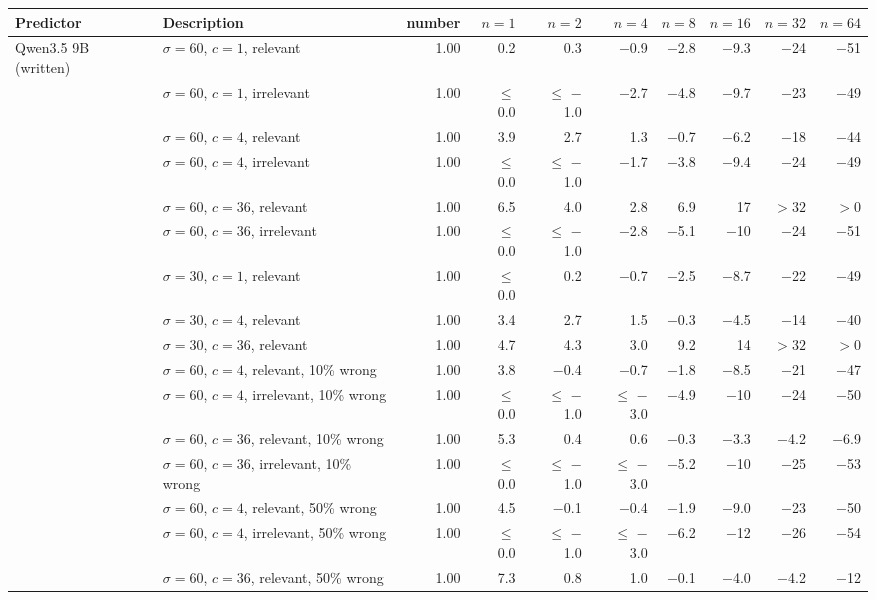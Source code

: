 \begin{tabular}{llrrrrrrrr}
\toprule
Predictor & Description & number & $n = 1$ & $n = 2$ & $n = 4$ & $n = 8$ & $n = 16$ & $n = 32$ & $n = 64$ \\
\midrule
Qwen3.5 9B (written) & $\sigma = 60$, $c = 1$, relevant & 1.00 & 0.2 & 0.3 & $-$0.9 & $-$2.8 & $-$9.3 & $-$24 & $-$51 \\
 & $\sigma = 60$, $c = 1$, irrelevant & 1.00 & $\leq$ 0.0 & $\leq$ $-$1.0 & $-$2.7 & $-$4.8 & $-$9.7 & $-$23 & $-$49 \\
 & $\sigma = 60$, $c = 4$, relevant & 1.00 & 3.9 & 2.7 & 1.3 & $-$0.7 & $-$6.2 & $-$18 & $-$44 \\
 & $\sigma = 60$, $c = 4$, irrelevant & 1.00 & $\leq$ 0.0 & $\leq$ $-$1.0 & $-$1.7 & $-$3.8 & $-$9.4 & $-$24 & $-$49 \\
 & $\sigma = 60$, $c = 36$, relevant & 1.00 & 6.5 & 4.0 & 2.8 & 6.9 & 17 & $> 32$ & $> 0$ \\
 & $\sigma = 60$, $c = 36$, irrelevant & 1.00 & $\leq$ 0.0 & $\leq$ $-$1.0 & $-$2.8 & $-$5.1 & $-$10 & $-$24 & $-$51 \\
 & $\sigma = 30$, $c = 1$, relevant & 1.00 & $\leq$ 0.0 & 0.2 & $-$0.7 & $-$2.5 & $-$8.7 & $-$22 & $-$49 \\
 & $\sigma = 30$, $c = 4$, relevant & 1.00 & 3.4 & 2.7 & 1.5 & $-$0.3 & $-$4.5 & $-$14 & $-$40 \\
 & $\sigma = 30$, $c = 36$, relevant & 1.00 & 4.7 & 4.3 & 3.0 & 9.2 & 14 & $> 32$ & $> 0$ \\
 & $\sigma = 60$, $c = 4$, relevant, 10\% wrong & 1.00 & 3.8 & $-$0.4 & $-$0.7 & $-$1.8 & $-$8.5 & $-$21 & $-$47 \\
 & $\sigma = 60$, $c = 4$, irrelevant, 10\% wrong & 1.00 & $\leq$ 0.0 & $\leq$ $-$1.0 & $\leq$ $-$3.0 & $-$4.9 & $-$10 & $-$24 & $-$50 \\
 & $\sigma = 60$, $c = 36$, relevant, 10\% wrong & 1.00 & 5.3 & 0.4 & 0.6 & $-$0.3 & $-$3.3 & $-$4.2 & $-$6.9 \\
 & $\sigma = 60$, $c = 36$, irrelevant, 10\% wrong & 1.00 & $\leq$ 0.0 & $\leq$ $-$1.0 & $\leq$ $-$3.0 & $-$5.2 & $-$10 & $-$25 & $-$53 \\
 & $\sigma = 60$, $c = 4$, relevant, 50\% wrong & 1.00 & 4.5 & $-$0.1 & $-$0.4 & $-$1.9 & $-$9.0 & $-$23 & $-$50 \\
 & $\sigma = 60$, $c = 4$, irrelevant, 50\% wrong & 1.00 & $\leq$ 0.0 & $\leq$ $-$1.0 & $\leq$ $-$3.0 & $-$6.2 & $-$12 & $-$26 & $-$54 \\
 & $\sigma = 60$, $c = 36$, relevant, 50\% wrong & 1.00 & 7.3 & 0.8 & 1.0 & $-$0.1 & $-$4.0 & $-$4.2 & $-$12 \\

\end{tabular}
